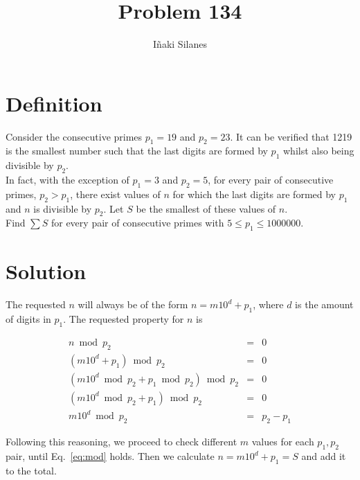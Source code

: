 \documentclass[english]{article}
\begin{document}
\newcommand{\mc}{\multicolumn}
\newcommand{\mr}{\multirow}
\newcommand{\cw}{\columnwidth}
\newcommand{\ig}[2]{\texttt{[image: \#2]}}

\title{Problem 134}
\author{I\~naki Silanes}
\maketitle

\section{Definition}

Consider the consecutive primes $p_1 = 19$ and $p_2 = 23$. It can be verified that 1219 is the smallest number such that the last digits are formed by $p_1$ whilst also being divisible by $p_2$.\\

In fact, with the exception of $p_1 = 3$ and $p_2 = 5$, for every pair of consecutive primes, $p_2 > p_1$, there exist values of $n$ for which the last digits are formed by $p_1$ and $n$ is divisible by $p_2$. Let $S$ be the smallest of these values of $n$.\\

Find $\sum S$ for every pair of consecutive primes with $5 \leq p_1 \leq 1000000$.

\section{Solution}

The requested $n$ will always be of the form $n = m 10^d + p_1$, where $d$ is the amount of digits in $p_1$. The requested property for $n$ is

\begin{eqnarray}
n \bmod p_2 & = & 0\\
(m 10^d + p_1) \bmod p_2 & = & 0\\
(m 10^d \bmod p_2 + p_1 \bmod p_2) \bmod p_2 & = & 0\\
(m 10^d \bmod p_2 + p_1) \bmod p_2 & = & 0\\
m 10^d \bmod p_2 & = & p_2 - p_1 \label{eq:mod}
\end{eqnarray}

Following this reasoning, we proceed to check different $m$ values for each $p_1, p_2$ pair, until Eq.~\ref{eq:mod} holds. Then we calculate $n = m 10^d + p_1 = S$ and add it to the total.
\end{document}
